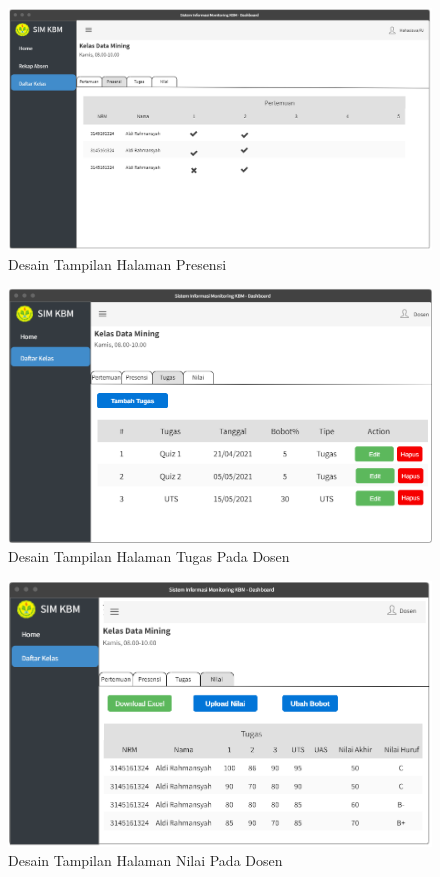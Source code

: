 \begin{figure}[h!]
	\centering
	\includegraphics[width=1\textwidth]{gambar/mockup/form06_presensi}
	\caption{Desain Tampilan Halaman Presensi}
	\label{fig:mockpresensi}
\end{figure}

\begin{figure}[h!]
	\centering
	\includegraphics[width=1\textwidth]{gambar/mockup/tugas_dosen}
	\caption{Desain Tampilan Halaman Tugas Pada Dosen}
	\label{fig:mocktugas}
\end{figure}

\begin{figure}[h!]
	\centering
	\includegraphics[width=1\textwidth]{gambar/mockup/nilai_dosen}
	\caption{Desain Tampilan Halaman Nilai Pada Dosen}
	\label{fig:mocknilai}
\end{figure}

